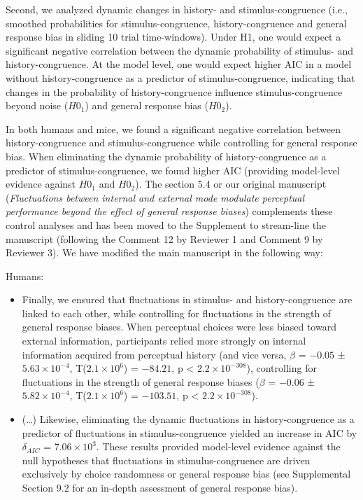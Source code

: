 \documentclass[
]{article}
\begin{document}
Second, we analyzed dynamic changes in history- and stimulus-congruence
(i.e., smoothed probabilities for stimulus-congruence,
history-congruence and general response bias in sliding 10 trial
time-windows). Under H1, one would expect a significant negative
correlation between the dynamic probability of stimulus- and
history-congruence. At the model level, one would expect higher AIC in a
model without history-congruence as a predictor of stimulus-congruence,
indicating that changes in the probability of history-congruence
influence stimulus-congruence beyond noise (\(H0_1\)) and general
response bias (\(H0_2\)).

In both humans and mice, we found a significant negative correlation
between history-congruence and stimulus-congruence while controlling for
general response bias. When eliminating the dynamic probability of
history-congruence as a predictor of stimulus-congruence, we found
higher AIC (providing model-level evidence against \(H0_1\) and
\(H0_2\)). The section 5.4 or our original manuscript
(\emph{Fluctuations between internal and external mode modulate
perceptual performance beyond the effect of general response biases})
complements these control analyses and has been moved to the Supplement
to stream-line the manuscript (following the Comment 12 by Reviewer 1
and Comment 9 by Reviewer 3). We have modified the main manuscript in
the following way:

Humans:

\begin{itemize}
\item
  Finally, we ensured that fluctuations in stimulus- and
  history-congruence are linked to each other, while controlling for
  fluctuations in the strength of general response biases. When
  perceptual choices were less biased toward external information,
  participants relied more strongly on internal information acquired
  from perceptual history (and vice versa, \(\beta\) = \(-0.05\) ±
  \(\ensuremath{5.63\times 10^{-4}}\),
  T(\(\ensuremath{2.1\times 10^{6}}\)) = \(-84.21\), p < \(\ensuremath{2.2\times 10^{-308}}\)),
  controlling for fluctuations in the strength of general response
  biases (\(\beta\) = \(-0.06\) ± \(\ensuremath{5.82\times 10^{-4}}\),
  T(\(\ensuremath{2.1\times 10^{6}}\)) = \(-103.51\), p < \(\ensuremath{2.2\times 10^{-308}}\)).
\item
  (\ldots) Likewise, eliminating the dynamic fluctuations in
  history-congruence as a predictor of fluctuations in
  stimulus-congruence yielded an increase in AIC by \(\delta_{AIC}\) =
  \(\ensuremath{7.06\times 10^{3}}\). These results provided model-level
  evidence against the null hypotheses that fluctuations in
  stimulus-congruence are driven exclusively by choice randomness or
  general response bias (see Supplemental Section 9.2 for an in-depth
  assessment of general response bias).
\end{itemize}
\end{document}
